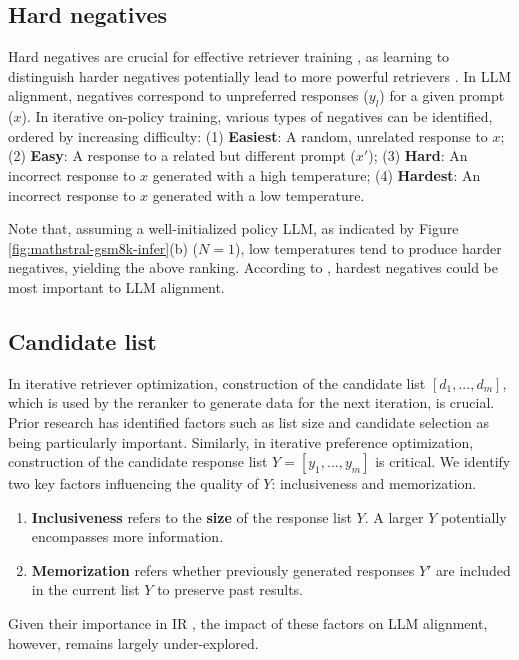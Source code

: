 \subsection{Hard negatives}\label{sec:hard-negative}
Hard negatives are crucial for effective retriever training \citep{zhan2021optimizing, qu2020rocketqa}, as learning to distinguish harder negatives potentially lead to more powerful retrievers \citep{xiong2020approximate}. 
In LLM alignment, negatives correspond to unpreferred responses ($y_l$) for a given prompt ($x$). 
In iterative on-policy training, various types of negatives can be identified, ordered by increasing difficulty: 
(1) \textbf{Easiest}: A random, unrelated response to $x$;
(2) \textbf{Easy}: A response to a related but different prompt ($x'$); 
(3) \textbf{Hard}: An incorrect response to $x$ generated with a high temperature; 
(4) \textbf{Hardest}: An incorrect response to $x$ generated with a low temperature.

Note that, assuming a well-initialized policy LLM, as indicated by Figure \ref{fig:mathstral-gsm8k-infer}(b) ($N=1$), low temperatures tend to produce harder negatives, yielding the above ranking.
According to \citet{zhan2021optimizing}, hardest negatives could be most important to LLM alignment. 

\subsection{Candidate list}
In iterative retriever optimization, construction of the candidate list $[d_1, ..., d_m]$, which is used by the reranker to generate data for the next iteration, is crucial. 
Prior research \citep{zeng2022curriculum} has identified factors such as list size and candidate selection as being particularly important. 
Similarly, in iterative preference optimization, construction of the candidate response list $Y=[y_1, ..., y_m]$ is critical. 
We identify two key factors influencing the quality of $Y$: inclusiveness and memorization.
\begin{enumerate}[label=(\arabic*), leftmargin=*]
    \item \textbf{Inclusiveness} \citep{qu2020rocketqa} refers to the \textbf{size} of the response list $Y$. A larger $Y$ potentially encompasses more information.
    \item \textbf{Memorization} \citep{zeng2022curriculum} refers whether previously generated responses $Y'$ are included in the current list $Y$ to preserve past results.
\end{enumerate}
Given their importance in IR \citep{qu2020rocketqa, zeng2022curriculum}, the impact of these factors on LLM alignment, however, remains largely under-explored.


